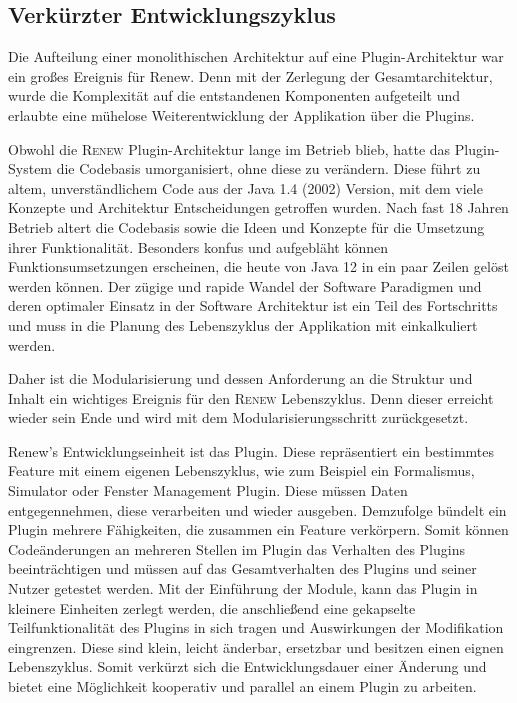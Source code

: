 \subsection{Verkürzter Entwicklungszyklus}\label{sub:vez}
	Die Aufteilung einer monolithischen Architektur auf eine Plugin-Architektur war ein großes Ereignis für Renew. Denn mit der Zerlegung der Gesamtarchitektur, wurde die Komplexität auf die entstandenen Komponenten aufgeteilt und erlaubte eine mühelose Weiterentwicklung der Applikation über die Plugins. \bigbreak

	Obwohl die \textsc{Renew} Plugin-Architektur lange im Betrieb blieb, hatte das Plugin-System die Codebasis umorganisiert, ohne diese zu verändern. Diese führt zu altem, unverständlichem Code aus der Java 1.4 (2002) Version, mit dem viele Konzepte und Architektur Entscheidungen getroffen wurden. Nach fast 18 Jahren Betrieb altert die Codebasis sowie die Ideen und Konzepte für die Umsetzung ihrer Funktionalität. Besonders konfus und aufgebläht können Funktionsumsetzungen erscheinen, die heute von Java 12 in ein paar Zeilen gelöst werden können. Der zügige und rapide Wandel der Software Paradigmen und deren optimaler Einsatz in der Software Architektur ist ein Teil des Fortschritts und muss in die Planung des Lebenszyklus der Applikation mit einkalkuliert werden. \newline

	Daher ist die Modularisierung und dessen Anforderung an die Struktur und Inhalt ein wichtiges Ereignis für den \textsc{Renew} Lebenszyklus. Denn dieser erreicht wieder sein Ende und wird mit dem Modularisierungsschritt zurückgesetzt. \bigbreak

	Renew's Entwicklungseinheit ist das Plugin. Diese repräsentiert ein bestimmtes Feature mit einem eigenen Lebenszyklus, wie zum Beispiel ein Formalismus, Simulator oder Fenster Management Plugin. Diese müssen Daten entgegennehmen, diese verarbeiten und wieder ausgeben. Demzufolge bündelt ein Plugin mehrere Fähigkeiten, die zusammen ein Feature verkörpern. Somit können Codeänderungen an mehreren Stellen im Plugin das Verhalten des Plugins beeinträchtigen und müssen auf das Gesamtverhalten des Plugins und seiner Nutzer getestet werden. Mit der Einführung der Module, kann das Plugin in kleinere Einheiten zerlegt werden, die anschließend eine gekapselte Teilfunktionalität des Plugins in sich tragen und Auswirkungen der Modifikation eingrenzen. Diese sind klein, leicht änderbar, ersetzbar und besitzen einen eignen Lebenszyklus. Somit verkürzt sich die Entwicklungsdauer einer Änderung und bietet eine Möglichkeit kooperativ und parallel an einem Plugin zu arbeiten. \newline

